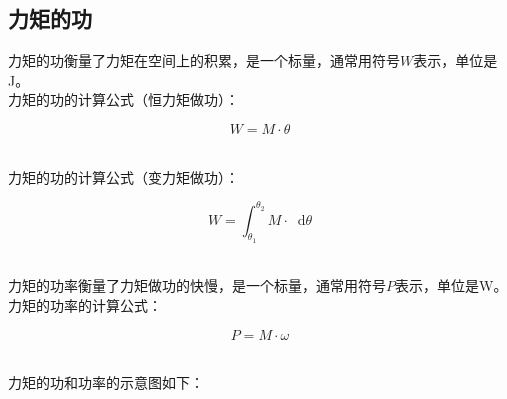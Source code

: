 \documentclass[UTF8]{ctexart}
\newcommand*{\dif}{\mathop{}\!\mathrm{d}}
\begin{document}
\subsection{力矩的功}
    力矩的功衡量了力矩在空间上的积累，是一个标量，通常用符号$W$表示，单位是\si{J}。\\[3mm]
    力矩的功的计算公式（恒力矩做功）：
    \begin{large}
        \begin{equation*}
            W=M\cdot\theta
        \end{equation*}
    \end{large}\\
    力矩的功的计算公式（变力矩做功）：
    \begin{large}
        \begin{equation*}
            W=\int_{\theta_1}^{\theta_2} M\cdot\dif\theta
        \end{equation*}
    \end{large}\\
    力矩的功率衡量了力矩做功的快慢，是一个标量，通常用符号$P$表示，单位是\si{W}。\\[3mm]
    力矩的功率的计算公式：
    \begin{large}
        \begin{equation*}
            P=M\cdot\omega
        \end{equation*}
    \end{large}\\
    力矩的功和功率的示意图如下：
\end{document}

